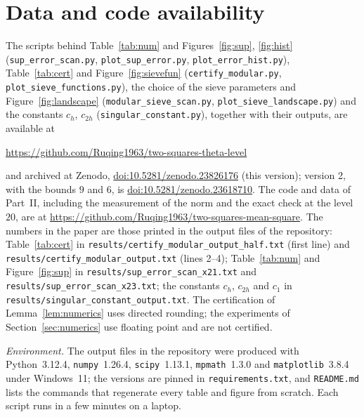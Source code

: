\documentclass[11pt]{amsart}
\theoremstyle{remark}
\begin{document}
\section*{Data and code availability}
{\sloppy
The scripts behind Table~\ref{tab:num} and Figures~\ref{fig:sup}, \ref{fig:hist} (\texttt{sup\_error\_scan.py}, \texttt{plot\_sup\_error.py}, \texttt{plot\_error\_hist.py}), Table~\ref{tab:cert} and Figure~\ref{fig:sievefun} (\texttt{certify\_modular.py}, \texttt{plot\_sieve\_functions.py}), the choice of the sieve parameters and Figure~\ref{fig:landscape} (\texttt{modular\_sieve\_scan.py}, \texttt{plot\_sieve\_landscape.py}) and the constants $c_h$, $c_{2h}$ (\texttt{singular\_constant.py}), together with their outputs, are available at
\begin{center}
\url{https://github.com/Ruqing1963/two-squares-theta-level}
\end{center}
and archived at Zenodo, \href{https://doi.org/10.5281/zenodo.23826176}{doi:10.5281/zenodo.23826176} (this version); version 2, with the bounds $9$ and $6$, is \href{https://doi.org/10.5281/zenodo.23618710}{doi:10.5281/zenodo.23618710}. The code and data of Part~II, including the measurement of the norm and the exact check at the level $20$, are at \url{https://github.com/Ruqing1963/two-squares-mean-square}. The numbers in the paper are those printed in the output files of the repository: Table~\ref{tab:cert} in \texttt{results/certify\_modular\_output\_half.txt} (first line) and \texttt{results/certify\_modular\_output.txt} (lines 2--4); Table~\ref{tab:num} and Figure~\ref{fig:sup} in \texttt{results/sup\_error\_scan\_x21.txt} and \texttt{results/sup\_error\_scan\_x23.txt}; the constants $c_h$, $c_{2h}$ and $c_1$ in \texttt{results/singular\_constant\_output.txt}. The certification of Lemma~\ref{lem:numerics} uses directed rounding; the experiments of Section~\ref{sec:numerics} use floating point and are not certified.

\emph{Environment.} The output files in the repository were produced with Python~3.12.4, \texttt{numpy}~1.26.4, \texttt{scipy}~1.13.1, \texttt{mpmath}~1.3.0 and \texttt{matplotlib}~3.8.4 under Windows~11; the versions are pinned in \texttt{requirements.txt}, and \texttt{README.md} lists the commands that regenerate every table and figure from scratch. Each script runs in a few minutes on a laptop.

}
\end{document}
